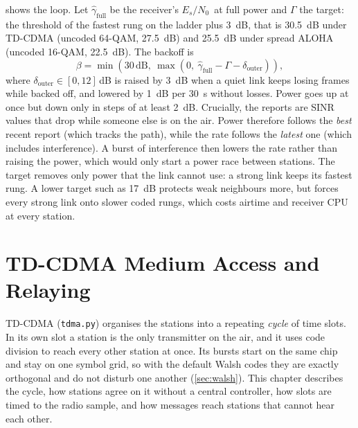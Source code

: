 \documentclass[11pt,a4paper,oneside]{report}
\newcommand{\code}[1]{\texttt{\small #1}}
\newcommand{\EsNo}{\ensuremath{E_s/N_0}}
\begin{document}
 shows the loop. Let $\hat\gamma_\text{full}$ be the receiver's \EsNo\ at full power and
$\Gamma$ the target: the threshold of the fastest rung on the ladder plus \SI{3}{dB}, that is
\SI{30.5}{dB} under TD-CDMA (uncoded 64-QAM, \SI{27.5}{dB}) and \SI{25.5}{dB} under spread ALOHA
(uncoded 16-QAM, \SI{22.5}{dB}). The backoff is
\begin{equation}
  \beta=\min\!\left(30\,\mathrm{dB},\ \max\!\left(0,\ \hat\gamma_\text{full}-\Gamma-\delta_\text{outer}\right)\right),
\end{equation}
where $\delta_\text{outer}\in[0,12]$\,dB is raised by \SI{3}{dB} when a quiet link keeps losing frames
while backed off, and lowered by \SI{1}{dB} per \SI{30}{s} without losses. Power goes up at once but
down only in steps of at least \SI{2}{dB}. Crucially, the reports are SINR values that drop while
someone else is on the air. Power therefore follows the \emph{best} recent report (which tracks the
path), while the rate follows the \emph{latest} one (which includes interference). A burst of
interference then lowers the rate rather than raising the power, which would only start a power race
between stations. The target removes only power that the link cannot use: a strong link keeps its
fastest rung. A lower target such as \SI{17}{dB} protects weak neighbours more, but forces every strong
link onto slower coded rungs, which costs airtime and receiver CPU at every station.

\chapter{TD-CDMA Medium Access and Relaying}\label{ch:tdcdma}
TD-CDMA (\code{tdma.py}) organises the stations into a repeating \emph{cycle} of time slots. In its
own slot a station is the only transmitter on the air, and it uses code division to reach every other
station at once. Its bursts start on the same chip and stay on one symbol grid, so with the default
Walsh codes they are exactly orthogonal and do not disturb one another (\cref{sec:walsh}). This chapter
describes the cycle, how stations agree on it without a central controller, how slots are timed to
the radio sample, and how messages reach stations that cannot hear each other.
\end{document}
